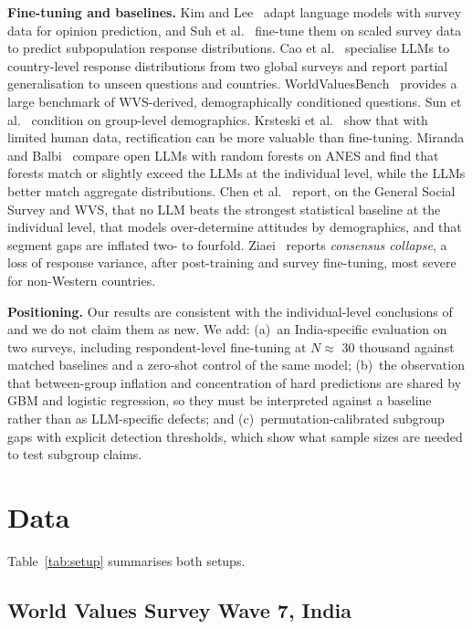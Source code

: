 \documentclass[conference]{IEEEtran}
\begin{document}
\textbf{Fine-tuning and baselines.} Kim and Lee~\cite{kim2023} adapt language models with survey data for opinion prediction, and Suh et al.~\cite{suh2025} fine-tune them on scaled survey data to predict subpopulation response distributions. Cao et al.~\cite{cao2025} specialise LLMs to country-level response distributions from two global surveys and report partial generalisation to unseen questions and countries. WorldValuesBench~\cite{zhao2024} provides a large benchmark of WVS-derived, demographically conditioned questions. Sun et al.~\cite{sun2024} condition on group-level demographics. Krsteski et al.~\cite{krsteski2025} show that with limited human data, rectification can be more valuable than fine-tuning. Miranda and Balbi~\cite{miranda2025} compare open LLMs with random forests on ANES and find that forests match or slightly exceed the LLMs at the individual level, while the LLMs better match aggregate distributions. Chen et al.~\cite{chen2026} report, on the General Social Survey and WVS, that no LLM beats the strongest statistical baseline at the individual level, that models over-determine attitudes by demographics, and that segment gaps are inflated two- to fourfold. Ziaei~\cite{ziaei2026} reports \emph{consensus collapse}, a loss of response variance, after post-training and survey fine-tuning, most severe for non-Western countries.

\textbf{Positioning.} Our results are consistent with the individual-level conclusions of~\cite{chen2026,miranda2025} and we do not claim them as new. We add: (a)~an India-specific evaluation on two surveys, including respondent-level fine-tuning at $N\approx$ 30 thousand against matched baselines and a zero-shot control of the same model; (b)~the observation that between-group inflation and concentration of hard predictions are shared by GBM and logistic regression, so they must be interpreted against a baseline rather than as LLM-specific defects; and (c)~permutation-calibrated subgroup gaps with explicit detection thresholds, which show what sample sizes are needed to test subgroup claims.

\section{Data}

Table~\ref{tab:setup} summarises both setups.

\subsection{World Values Survey Wave 7, India}
\end{document}
